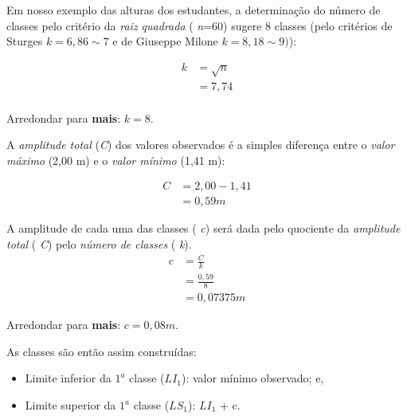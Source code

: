 \documentclass[
]{book}
\providecommand{\tightlist}{%
  \setlength{\itemsep}{0pt}\setlength{\parskip}{0pt}}
\begin{document}
\hfill\break

Em nosso exemplo das alturas dos estudantes, a determinação do número de classes pelo critério da \emph{raiz quadrada} ( \emph{n}=60) sugere 8 classes (pelo critérios de Sturges \(k=6,86 \sim 7\) e de Giuseppe Milone \(k=8,18 \sim 9)\)):

\hfill\break

\begin{align*}
k & =\sqrt{n} \\
 & = 7,74 \\
\end{align*}

\hfill\break

Arredondar para \textbf{mais}: \(k=8\).

\hfill\break

A \emph{amplitude total} (\emph{C}) dos valores observados é a simples diferença entre o \emph{valor máximo} (2,00 m) e o \emph{valor mínimo} (1,41 m):

\hfill\break

\begin{align*}
C & =2,00-1,41 \\
 & =0,59 m 
\end{align*}

\hfill\break

A amplitude de cada uma das classes ( \emph{c}) será dada pelo quociente da \emph{amplitude total} ( \emph{C}) pelo \emph{número de classes} ( \emph{k}).\\

\begin{align*}
c & = \frac{C}{k} \\
  & = \frac{0,59}{8}\\ 
  & = 0,07375 m
\end{align*}

\hfill\break

Arredondar para \textbf{mais}: \(c=0,08 m\).

\hfill\break

As classes são então assim construídas:

\hfill\break

\begin{itemize}
\tightlist
\item
  Limite inferior da \(1^{a}\) classe (\(LI_{1}\)): valor mínimo observado; e,
\item
  Limite superior da \(1^{a}\) classe (\(LS_{1}\)): \(LI_{1}\) + c.~
\end{itemize}
\end{document}
